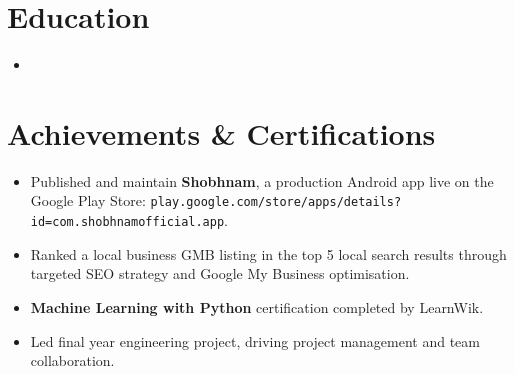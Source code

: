 \documentclass[11pt,a4paper,sans]{moderncv}
\begin{document}
\begin{itemize}
\end{itemize}


\section{Education}
\vspace{1pt}
\begin{itemize}

\item{}

\end{itemize}


\section{Achievements \& Certifications}
\vspace{1pt}
\begin{itemize}
\item{Published and maintain \textbf{Shobhnam}, a production Android app live on the Google Play Store: \texttt{play.google.com/store/apps/details?id=com.shobhnamofficial.app}.}
\item{Ranked a local business GMB listing in the top 5 local search results through targeted SEO strategy and Google My Business optimisation.}
\item{\textbf{Machine Learning with Python} certification completed by LearnWik.}
\item{Led final year engineering project, driving project management and team collaboration.}
\end{itemize}

\end{document}
